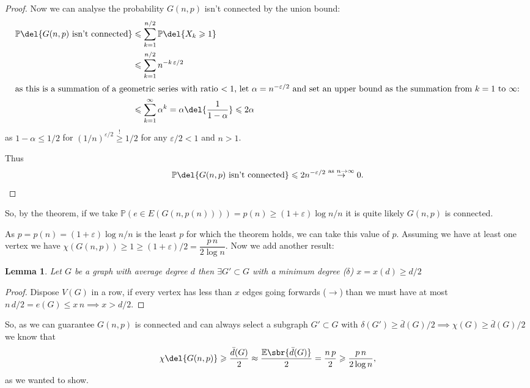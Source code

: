 \documentclass[english]{IMTexam}
\newtheorem{lemma}{Lemma}
\begin{document}
\begin{questions}
\begin{solution}
\begin{proof}
				Now we can analyse the probability $ G(n,p) $ isn't connected by the union bound:
				\begin{align*}
					\mathbb{P}\del{G(n,p)\textup{ isn't connected}}&\leqslant\sum_{k=1}^{n/2}\mathbb{P}\del{X_k\geqslant1}\\
					&\leqslant\sum_{k=1}^{n/2}n^{-k\,\varepsilon/2}\\
					\intertext{as this is a summation of a geometric series with ratio $ <1 $, let $ \alpha=n^{-\varepsilon/2} $ and set an upper bound as the summation from $ k=1 $ to $ \infty $:}
					&\leqslant\sum_{k=1}^{\infty}\alpha^{k}=\alpha\del{\dfrac{1}{1-\alpha}}\leqslant 2\alpha
				\end{align*}
				as $ 1-\alpha\leqslant 1/2 $ for $ (1/n)^{\varepsilon/2}\overset{!}{\geqslant} 1/2 $ for any $ \varepsilon/2<1 $ and $ n>1 $.
				
				Thus
				\[ \mathbb{P}\del{G(n,p)\textup{ isn't connected}}\leqslant 2n^{-\varepsilon/2}\overset{\textup{as }n\to\infty}{\to} 0. \]
			\end{proof}
		
			So, by the theorem, if we take $ \mathbb{P}(e\in E(G(n,p(n))))= p(n)\geqslant (1+\varepsilon)\log n/n $ it is quite likely $ G(n,p) $ is connected.
		
			As $ p=p(n)=(1+\varepsilon)\log n/n $ is the least $ p $ for which the theorem holds, we can take this value of $ p $. Assuming we have at least one vertex we have $ \chi(G(n,p))\geqslant 1 \geqslant (1+\varepsilon)/2=\dfrac{p\,n}{2\log n} $.
			Now we add another result:
			\begin{lemma}\label{lem:l1trees}
				Let $ G $ be a graph with average degree $ d $ then $ \exists G'\subset G $ with a minimum degree ($ \delta $) $ x=x(d)\geqslant d/2 $
			\end{lemma}
			
			\begin{proof}
				Dispose $ V(G) $ in a row, if every vertex has less than $ x $ edges going forwards ($ \rightarrow $) than we must have at most $ n\,d/2=e(G)\leqslant x\,n\implies x>d/2 $.
			\end{proof}
			So, as we can guarantee $ G(n,p) $ is connected and can always select a subgraph $ G'\subset G $ with $ \delta(G')\geqslant \bar{d}(G)/2\implies \chi(G)\geqslant \bar{d}(G)/2 $ we know that 
			\[ \chi\del{G(n,p)}\geqslant \dfrac{\bar{d}(G)}{2}\approx \dfrac{\mathbb{E}\sbr{\bar{d}(G)}}{2}=\dfrac{n\,p}{2}\geqslant \dfrac{p\,n}{2\log n}, \]
			as we wanted to show.
			

\end{solution}
\end{questions}
\end{document}
